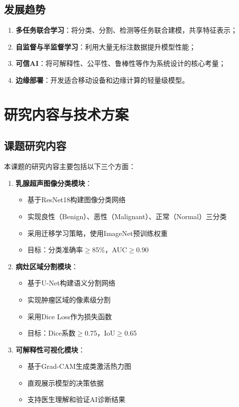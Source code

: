 \documentclass[supercite]{Hust-undergraduate-kaiti}
\theoremstyle{definition}
\begin{document}
\subsection{发展趋势}

\begin{enumerate}
    \item \textbf{多任务联合学习}：将分类、分割、检测等任务联合建模，共享特征表示；
    \item \textbf{自监督与半监督学习}：利用大量无标注数据提升模型性能；
    \item \textbf{可信AI}：将可解释性、公平性、鲁棒性等作为系统设计的核心考量；
    \item \textbf{边缘部署}：开发适合移动设备和边缘计算的轻量级模型。
\end{enumerate}

\section{研究内容与技术方案}

\subsection{课题研究内容}

本课题的研究内容主要包括以下三个方面：

\begin{enumerate}
    \item \textbf{乳腺超声图像分类模块}：
    \begin{itemize}
        \item 基于ResNet18构建图像分类网络
        \item 实现良性（Benign）、恶性（Malignant）、正常（Normal）三分类
        \item 采用迁移学习策略，使用ImageNet预训练权重
        \item 目标：分类准确率$\geq$85\%，AUC$\geq$0.90
    \end{itemize}
    
    \item \textbf{病灶区域分割模块}：
    \begin{itemize}
        \item 基于U-Net构建语义分割网络
        \item 实现肿瘤区域的像素级分割
        \item 采用Dice Loss作为损失函数
        \item 目标：Dice系数$\geq$0.75，IoU$\geq$0.65
    \end{itemize}
    
    \item \textbf{可解释性可视化模块}：
    \begin{itemize}
        \item 基于Grad-CAM生成类激活热力图
        \item 直观展示模型的决策依据
        \item 支持医生理解和验证AI诊断结果
    \end{itemize}
\end{enumerate}
\end{document}
